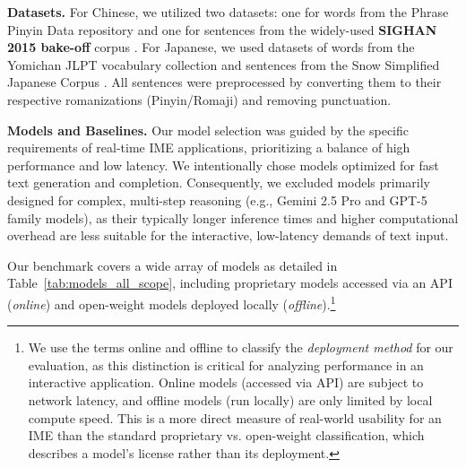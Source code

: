 \documentclass[10pt, a4paper]{article}
\begin{document}
\textbf{Datasets.}
For Chinese, we utilized two datasets: one for words from the Phrase Pinyin Data repository  and one for sentences from the widely-used \textbf{SIGHAN 2015 bake-off} corpus \citep{tseng2015introduction}. For Japanese, we used datasets of words from the Yomichan JLPT vocabulary collection  and sentences from the Snow Simplified Japanese Corpus . All sentences were preprocessed by converting them to their respective romanizations (Pinyin/Romaji) and removing punctuation.

\textbf{Models and Baselines.}
Our model selection was guided by the specific requirements of real-time IME applications, prioritizing a balance of high performance and low latency. We intentionally chose models optimized for fast text generation and completion. Consequently, we excluded models primarily designed for complex, multi-step reasoning (e.g., Gemini 2.5 Pro and GPT-5 family models), as their typically longer inference times and higher computational overhead are less suitable for the interactive, low-latency demands of text input.

Our benchmark covers a wide array of models as detailed in Table~\ref{tab:models_all_scope}, including proprietary models accessed via an API (\textit{online}) and open-weight models deployed locally (\textit{offline}).\footnote{We use the terms {online} and {offline} to classify the \textit{deployment method} for our evaluation, as this distinction is critical for analyzing performance in an interactive application. {Online} models (accessed via API) are subject to network latency, and {offline} models (run locally) are only limited by local compute speed. This is a more direct measure of real-world usability for an IME than the standard proprietary vs. open-weight classification, which describes a model's license rather than its deployment.}
\end{document}
